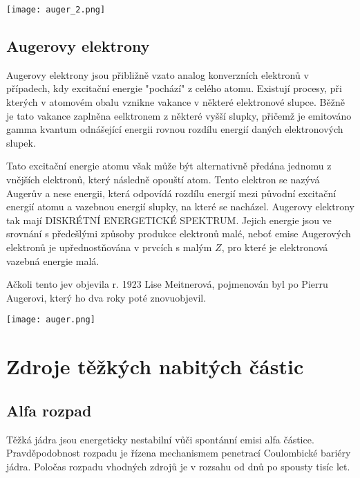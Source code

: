 \documentclass[../../main.tex]{subfiles}
\begin{document}
\begin{center}
	\texttt{[image: auger\_2.png]}
\end{center}  

\subsection{Augerovy elektrony}
 
 Augerovy elektrony jsou přibližně vzato analog konverzních elektronů v případech, kdy excitační energie "pochází" z celého atomu. Existují procesy, při kterých v atomovém obalu vznikne vakance v některé elektronové slupce. Běžně je tato vakance zaplněna eelktronem z některé vyšší slupky, přičemž je emitováno gamma kvantum odnášející energii rovnou rozdílu energií daných elektronových slupek.
 
 Tato excitační energie atomu však může být alternativně předána jednomu z vnějších elektronů, který následně opouští atom. Tento elektron se nazývá Augerův a nese energii, která odpovídá rozdílu energií mezi původní excitační energií atomu a vazebnou energií slupky, na které se nacházel. Augerovy elektrony tak mají DISKRÉTNÍ ENERGETICKÉ SPEKTRUM. Jejich energie jsou ve srovnání s předešlými způsoby produkce elektronů malé, neboť emise Augerových elektronů je upřednostňována v prvcích s malým $Z$, pro které je elektronová vazebná energie malá.
 
 Ačkoli tento jev objevila r. 1923 Lise Meitnerová, pojmenován byl po Pierru Augerovi, který ho dva roky poté znovuobjevil. 
 
 \begin{center}
 	\texttt{[image: auger.png]}
 \end{center}  
 
\section{Zdroje těžkých nabitých částic}

\subsection{Alfa rozpad}

Těžká jádra jsou energeticky nestabilní vůči spontánní emisi alfa částice. Pravděpodobnost rozpadu je řízena mechanismem penetrací Coulombické bariéry jádra. Poločas rozpadu vhodných zdrojů je v rozsahu od dnů po spousty tisíc let. 
\end{document}
